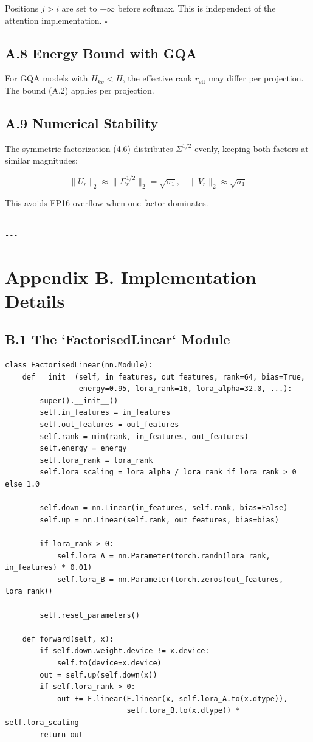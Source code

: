 Positions $j > i$ are set to $-\infty$ before softmax. This is independent 
of the attention implementation. $\square$

\subsection{A.8 Energy Bound with GQA}

For GQA models with $H_{kv} < H$, the effective rank $r_\text{eff}$ may 
differ per projection. The bound (A.2) applies per projection.

\subsection{A.9 Numerical Stability}

The symmetric factorization (4.6) distributes $\Sigma^{1/2}$ evenly, keeping 
both factors at similar magnitudes:

\[
\|U_r\|_2 \approx \|\Sigma_r^{1/2}\|_2 = \sqrt{\sigma_1}, \quad
\|V_r\|_2 \approx \sqrt{\sigma_1}
\tag{A.5}
\]

This avoids FP16 overflow when one factor dominates.
\begin{lstlisting}

---
\end{lstlisting}


\section{Appendix B. Implementation Details}

\subsection{B.1 The `FactorisedLinear` Module}

\begin{lstlisting}
class FactorisedLinear(nn.Module):
    def __init__(self, in_features, out_features, rank=64, bias=True,
                 energy=0.95, lora_rank=16, lora_alpha=32.0, ...):
        super().__init__()
        self.in_features = in_features
        self.out_features = out_features
        self.rank = min(rank, in_features, out_features)
        self.energy = energy
        self.lora_rank = lora_rank
        self.lora_scaling = lora_alpha / lora_rank if lora_rank > 0 else 1.0
        
        self.down = nn.Linear(in_features, self.rank, bias=False)
        self.up = nn.Linear(self.rank, out_features, bias=bias)
        
        if lora_rank > 0:
            self.lora_A = nn.Parameter(torch.randn(lora_rank, in_features) * 0.01)
            self.lora_B = nn.Parameter(torch.zeros(out_features, lora_rank))
        
        self.reset_parameters()
    
    def forward(self, x):
        if self.down.weight.device != x.device:
            self.to(device=x.device)
        out = self.up(self.down(x))
        if self.lora_rank > 0:
            out += F.linear(F.linear(x, self.lora_A.to(x.dtype)), 
                            self.lora_B.to(x.dtype)) * self.lora_scaling
        return out
\end{lstlisting}

